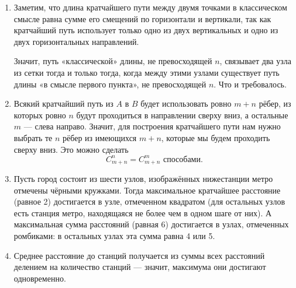 \begin{enumerate}
\item Заметим, что длина кратчайшего пути между двумя точками в классическом смысле равна сумме его смещений по горизонтали и вертикали, так как кратчайший путь использует только одно из двух вертикальных и одно из двух горизонтальных направлений.

Значит, путь «классической» длины, не превосходящей $n$, связывает два узла из сетки тогда и только тогда, когда между этими узлами существует путь длины «в смысле первого пункта», не превосходящей $n$. Что и требовалось.

\item Всякий кратчайший путь из $A$ в $B$ будет использовать ровно $m+n$ рёбер, из которых ровно $n$ будут проходиться в направлении сверху вниз, а остальные $m$ — слева направо. Значит, для построения кратчайшего пути нам нужно выбрать те $n$ рёбер из имеющихся $m+n$, которые мы будем проходить сверху вниз. Это можно сделать
$$C_{m+n}^n = C_{m+n}^m \text{ способами.}$$

\item Пусть город состоит из шести узлов, изображённых ниже\scolon станции метро отмечены чёрными кружками. Тогда максимальное кратчайшее расстояние (равное 2) достигается в узле, отмеченном квадратом (для остальных узлов есть станция метро, находящаяся не более чем в одном шаге от них). А максимальная сумма расстояний (равная 6) достигается в узлах, отмеченных ромбиками: в остальных узлах эта сумма равна  4 или 5.

\begin{center}  \end{center}


\item Среднее расстояние до станций получается из суммы всех расстояний делением на количество станций — значит, максимума они достигают одновременно.


\end{enumerate}
